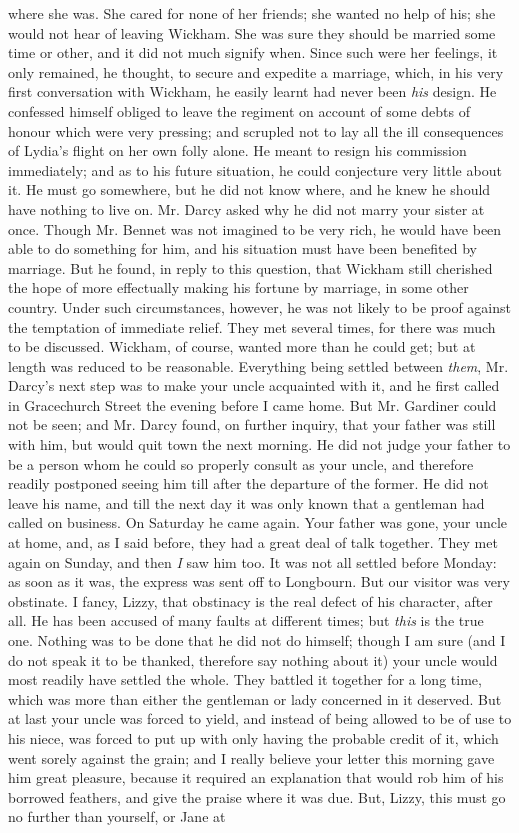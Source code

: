 \documentclass[12pt]{book}
\begin{document}
where she was. She cared for none of her friends; she wanted no help of his; she would not hear of leaving Wickham. She was sure they should be married some time or other, and it did not much signify when. Since such were her feelings, it only remained, he thought, to secure and expedite a marriage, which, in his very first conversation with Wickham, he easily learnt had never been \textit{his} design. He confessed himself obliged to leave the regiment on account of some debts of honour which were very pressing; and scrupled not to lay all the ill consequences of Lydia's flight on her own folly alone. He meant to resign his commission immediately; and as to his future situation, he could conjecture very little about it. He must go somewhere, but he did not know where, and he knew he should have nothing to live on. Mr. Darcy asked why he did not marry your sister at once. Though Mr. Bennet was not imagined to be very rich, he would have been able to do something for him, and his situation must have been benefited by marriage. But he found, in reply to this question, that Wickham still cherished the hope of more effectually making his fortune by marriage, in some other country. Under such circumstances, however, he was not likely to be proof against the temptation of immediate relief. They met several times, for there was much to be discussed. Wickham, of course, wanted more than he could get; but at length was reduced to be reasonable. Everything being settled between \textit{them}, Mr. Darcy's next step was to make your uncle acquainted with it, and he first called in Gracechurch Street the evening before I came home. But Mr. Gardiner could not be seen; and Mr. Darcy found, on further inquiry, that your father was still with him, but would quit town the next morning. He did not judge your father to be a person whom he could so properly consult as your uncle, and therefore readily postponed seeing him till after the departure of the former. He did not leave his name, and till the next day it was only known that a gentleman had called on business. On Saturday he came again. Your father was gone, your uncle at home, and, as I said before, they had a great deal of talk together. They met again on Sunday, and then \textit{I} saw him too. It was not all settled before Monday: as soon as it was, the express was sent off to Longbourn. But our visitor was very obstinate. I fancy, Lizzy, that obstinacy is the real defect of his character, after all. He has been accused of many faults at different times; but \textit{this} is the true one. Nothing was to be done that he did not do himself; though I am sure (and I do not speak it to be thanked, therefore say nothing about it) your uncle would most readily have settled the whole. They battled it together for a long time, which was more than either the gentleman or lady concerned in it deserved. But at last your uncle was forced to yield, and instead of being allowed to be of use to his niece, was forced to put up with only having the probable credit of it, which went sorely against the grain; and I really believe your letter this morning gave him great pleasure, because it required an explanation that would rob him of his borrowed feathers, and give the praise where it was due. But, Lizzy, this must go no further than yourself, or Jane at 
\end{document}

